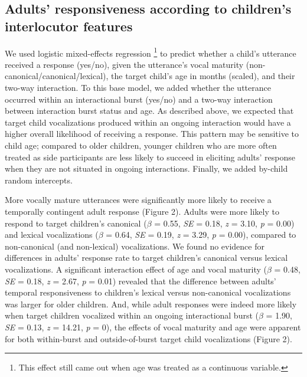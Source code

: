 \documentclass[
  man]{apa6}
\begin{document}
\hypertarget{adults-responsiveness-according-to-childrens-interlocutor-features}{%
\subsection{Adults' responsiveness according to children's interlocutor features}\label{adults-responsiveness-according-to-childrens-interlocutor-features}}

We used logistic mixed-effects regression \footnote{This effect still came out when age was treated as a continuous variable.} to predict whether a child's utterance received a response (yes/no), given the utterance's vocal maturity (non-canonical/canonical/lexical), the target child's age in months (scaled), and their two-way interaction. To this base model, we added whether the utterance occurred within an interactional burst (yes/no) and a two-way interaction between interaction burst status and age. As described above, we expected that target child vocalizations produced within an ongoing interaction would have a higher overall likelihood of receiving a response. This pattern may be sensitive to child age; compared to older children, younger children who are more often treated as side participants are less likely to succeed in eliciting adults' response when they are not situated in ongoing interactions. Finally, we added by-child random intercepts.

More vocally mature utterances were significantly more likely to receive a temporally contingent adult response (Figure 2). Adults were more likely to respond to target children's canonical (\(\beta\) = 0.55, \emph{SE} = 0.18, \emph{z} = 3.10, \emph{p} = 0.00) and lexical vocalizations (\(\beta\) = 0.64, \emph{SE} = 0.19, \emph{z} = 3.29, \emph{p} = 0.00), compared to non-canonical (and non-lexical) vocalizations. We found no evidence for differences in adults' response rate to target children's canonical versus lexical vocalizations. A significant interaction effect of age and vocal maturity (\(\beta\) = 0.48, \emph{SE} = 0.18, \emph{z} = 2.67, \emph{p} = 0.01) revealed that the difference between adults' temporal responsiveness to children's lexical versus non-canonical vocalizations was larger for older children. And, while adult responses were indeed more likely when target children vocalized within an ongoing interactional burst (\(\beta\) = 1.90, \emph{SE} = 0.13, \emph{z} = 14.21, \emph{p} = 0), the effects of vocal maturity and age were apparent for both within-burst and outside-of-burst target child vocalizations (Figure 2).
\end{document}
